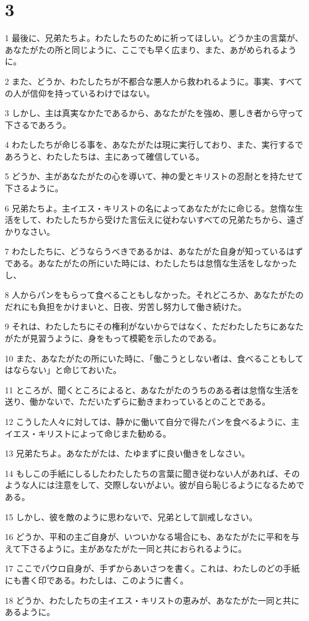 \chapter{3}

\par 1 最後に、兄弟たちよ。わたしたちのために祈ってほしい。どうか主の言葉が、あなたがたの所と同じように、ここでも早く広まり、また、あがめられるように。
\par 2 また、どうか、わたしたちが不都合な悪人から救われるように。事実、すべての人が信仰を持っているわけではない。
\par 3 しかし、主は真実なかたであるから、あなたがたを強め、悪しき者から守って下さるであろう。
\par 4 わたしたちが命じる事を、あなたがたは現に実行しており、また、実行するであろうと、わたしたちは、主にあって確信している。
\par 5 どうか、主があなたがたの心を導いて、神の愛とキリストの忍耐とを持たせて下さるように。
\par 6 兄弟たちよ。主イエス・キリストの名によってあなたがたに命じる。怠惰な生活をして、わたしたちから受けた言伝えに従わないすべての兄弟たちから、遠ざかりなさい。
\par 7 わたしたちに、どうならうべきであるかは、あなたがた自身が知っているはずである。あなたがたの所にいた時には、わたしたちは怠惰な生活をしなかったし、
\par 8 人からパンをもらって食べることもしなかった。それどころか、あなたがたのだれにも負担をかけまいと、日夜、労苦し努力して働き続けた。
\par 9 それは、わたしたちにその権利がないからではなく、ただわたしたちにあなたがたが見習うように、身をもって模範を示したのである。
\par 10 また、あなたがたの所にいた時に、「働こうとしない者は、食べることもしてはならない」と命じておいた。
\par 11 ところが、聞くところによると、あなたがたのうちのある者は怠惰な生活を送り、働かないで、ただいたずらに動きまわっているとのことである。
\par 12 こうした人々に対しては、静かに働いて自分で得たパンを食べるように、主イエス・キリストによって命じまた勧める。
\par 13 兄弟たちよ。あなたがたは、たゆまずに良い働きをしなさい。
\par 14 もしこの手紙にしるしたわたしたちの言葉に聞き従わない人があれば、そのような人には注意をして、交際しないがよい。彼が自ら恥じるようになるためである。
\par 15 しかし、彼を敵のように思わないで、兄弟として訓戒しなさい。
\par 16 どうか、平和の主ご自身が、いついかなる場合にも、あなたがたに平和を与えて下さるように。主があなたがた一同と共におられるように。
\par 17 ここでパウロ自身が、手ずからあいさつを書く。これは、わたしのどの手紙にも書く印である。わたしは、このように書く。
\par 18 どうか、わたしたちの主イエス・キリストの恵みが、あなたがた一同と共にあるように。


